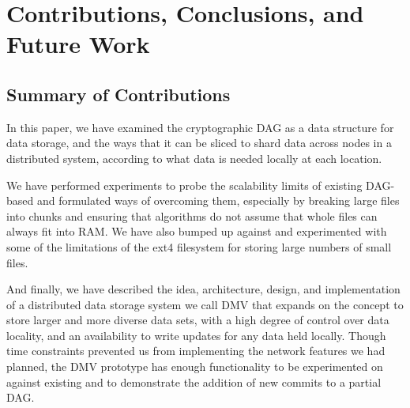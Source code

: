 \chapter{Contributions, Conclusions, and Future Work}


\section{Summary of Contributions}

In this paper, we have examined the cryptographic \acrfull{DAG} as a data
structure for data storage, and the ways that it can be sliced to shard data
across nodes in a distributed system, according to what data is needed locally
at each location.

We have performed experiments to probe the scalability limits of existing
\gls{DAG}-based  and formulated ways of overcoming them,
especially by breaking large files into chunks and ensuring that algorithms do
not assume that whole files can always fit into RAM. We have also bumped up
against and experimented with some of the limitations of the ext4 filesystem for
storing large numbers of small files.

And finally, we have described the idea, architecture, design, and
implementation of a distributed data storage system we call \gls{DMV} that
expands on the  concept to store
larger and more diverse data sets, with a high degree of control over data
locality, and an availability to write updates for any data held locally. Though
time constraints prevented us from implementing the network features we had
planned, the \gls{DMV} prototype has enough functionality to be experimented on
against existing  and to demonstrate the addition of new
\glspl{commit} to a partial \gls{DAG}.

